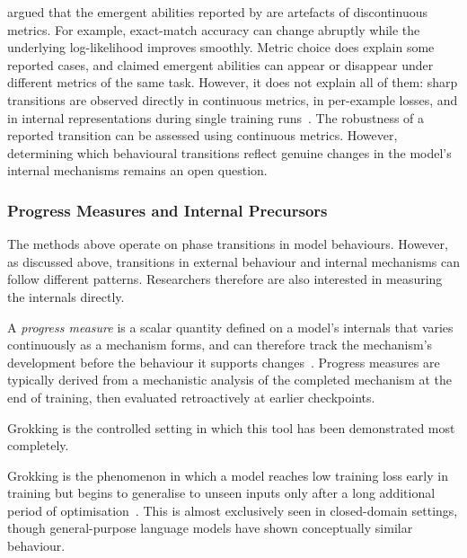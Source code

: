 \begin{warningbox}
 argued that the emergent abilities reported by  are artefacts of discontinuous metrics. For example, exact-match accuracy can change abruptly while the underlying log-likelihood improves smoothly. Metric choice does explain some reported cases, and claimed emergent abilities can appear or disappear under different metrics of the same task. However, it does not explain all of them: sharp transitions are observed directly in continuous metrics, in per-example losses, and in internal representations during single training runs~. The robustness of a reported transition can be assessed using continuous metrics. However, determining which behavioural transitions reflect genuine changes in the model’s internal mechanisms remains an open question.


\end{warningbox}

\subsubsection{Progress Measures and Internal Precursors}
\label{sec:ld-progress}

The methods above operate on phase transitions in model behaviours. However, as discussed above, transitions in external behaviour and internal mechanisms can follow different patterns. Researchers therefore are also interested in measuring the internals directly.

\begin{definitionbox}
A \emph{progress measure} is a scalar quantity defined on a model's internals that varies continuously as a mechanism forms, and can therefore track the mechanism's development before the behaviour it supports changes~. Progress measures are typically derived from a mechanistic analysis of the completed mechanism at the end of training, then evaluated retroactively at earlier checkpoints.
\end{definitionbox}

Grokking is the controlled setting in which this tool has been demonstrated most completely.

\begin{definitionbox}[Grokking]
Grokking is the phenomenon in which a model reaches low training loss early in training but begins to generalise to unseen inputs only after a long additional period of optimisation~. This is almost exclusively seen in closed-domain settings, though general-purpose language models have shown conceptually similar behaviour.
\end{definitionbox}

